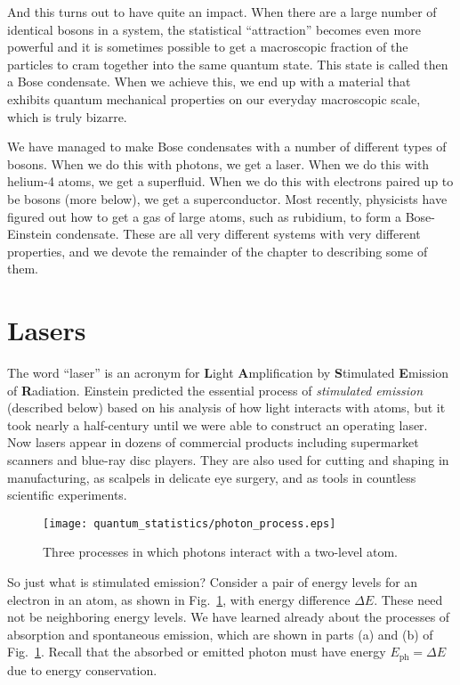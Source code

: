 And this turns out to have quite an impact.  When there are a large
number of identical bosons in a system, the statistical ``attraction''
becomes even more powerful and it is sometimes possible to get a
macroscopic fraction of the particles to cram together into the same
quantum state.  This state is called then a Bose condensate.  When we
achieve this, we end up with a material that exhibits quantum
mechanical properties on our everyday macroscopic scale, which is
truly bizarre.

We have managed to make Bose condensates with a number of different
types of bosons.  When we do this with photons, we get a laser.  When we
do this with helium-4 atoms, we get a superfluid.  When we do this with
electrons paired up to be bosons (more below), we get a superconductor.
Most recently, physicists have figured out how to get a gas of large atoms,
such as rubidium, to form a Bose-Einstein condensate.  These are all very
different systems with very different properties, and we devote the remainder
of the chapter to describing some of them.

\section{Lasers}

The word ``laser'' is an acronym for \textbf{L}ight
\textbf{A}mplification by \textbf{S}timulated \textbf{E}mission of
\textbf{R}adiation.  Einstein predicted the essential process of
\textit{stimulated emission} (described below) based on his analysis
of how light interacts with atoms, but it took nearly a half-century
until we were able to construct an operating laser. Now lasers appear
in dozens of commercial products including supermarket scanners and
blue-ray disc players. They are also used for cutting and shaping in
manufacturing, as scalpels in delicate eye surgery, and as tools in
countless scientific experiments.

\begin{figure}[t]
\begin{center}
\texttt{[image: quantum\_statistics/photon\_process.eps]}
\caption{Three processes in which photons interact with a two-level
  atom.}
\label{fig:photon_process}
\end{center}
\end{figure}

So just what is stimulated emission?  Consider a pair of energy levels
for an electron in an atom, as shown in Fig.~\ref{fig:photon_process},
with energy difference $\Delta E$.  These need not be neighboring
energy levels.  We have learned already about the processes of
absorption and spontaneous emission, which are shown in parts (a) and
(b) of Fig.~\ref{fig:photon_process}.  Recall that the absorbed or
emitted photon must have energy $E_\text{ph}=\Delta E$ due to energy
conservation.  


